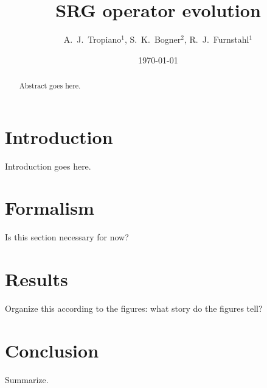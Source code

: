 \documentclass[preprintnumbers,floatfix,aps,prc,preprint,nofootinbib]{revtex4-1}
\begin{document}
\title{SRG operator evolution}


\author{A.~J.~Tropiano$^{1}$, S.~K.~Bogner$^{2}$, R.~J.~Furnstahl$^{1}$}


\date{\today}

\begin{abstract}

Abstract goes here.

\end{abstract}


\maketitle

\newpage


\section{Introduction}
\label{sec:intro}


Introduction goes here.


\section{Formalism}
\label{sec:formalism}


Is this section necessary for now?

\section{Results}
\label{sec:results}


Organize this according to the figures: what story do the figures tell?

	
\section{Conclusion}
\label{sec:conclusion}


Summarize.




 
\end{document}

